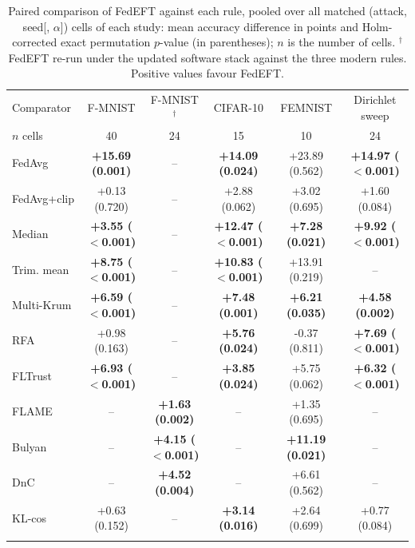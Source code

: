\begin{table}[!tbp]
\centering
\caption{Paired comparison of FedEFT against each rule, pooled over all matched (attack, seed[, $\alpha$]) cells of each study: mean accuracy difference in points and Holm-corrected exact permutation $p$-value (in parentheses); $n$ is the number of cells. $^\dagger$FedEFT re-run under the updated software stack against the three modern rules. Positive values favour FedEFT.}
\label{tab:stats}
\setlength{\tabcolsep}{2.2pt}
\footnotesize
\begin{tabular}{@{}lccccc@{}}
\toprule
Comparator & F-MNIST & F-MNIST$^\dagger$ & CIFAR-10 & FEMNIST & Dirichlet sweep\\
$n$ cells & 40 & 24 & 15 & 10 & 24\\
\midrule
FedAvg & \textbf{+15.69 (0.001)} & -- & \textbf{+14.09 (0.024)} & +23.89 (0.562) & \textbf{+14.97 ($<$0.001)}\\
FedAvg+clip & +0.13 (0.720) & -- & +2.88 (0.062) & +3.02 (0.695) & +1.60 (0.084)\\
Median & \textbf{+3.55 ($<$0.001)} & -- & \textbf{+12.47 ($<$0.001)} & \textbf{+7.28 (0.021)} & \textbf{+9.92 ($<$0.001)}\\
Trim. mean & \textbf{+8.75 ($<$0.001)} & -- & \textbf{+10.83 ($<$0.001)} & +13.91 (0.219) & --\\
Multi-Krum & \textbf{+6.59 ($<$0.001)} & -- & \textbf{+7.48 (0.001)} & \textbf{+6.21 (0.035)} & \textbf{+4.58 (0.002)}\\
RFA & +0.98 (0.163) & -- & \textbf{+5.76 (0.024)} & -0.37 (0.811) & \textbf{+7.69 ($<$0.001)}\\
FLTrust & \textbf{+6.93 ($<$0.001)} & -- & \textbf{+3.85 (0.024)} & +5.75 (0.062) & \textbf{+6.32 ($<$0.001)}\\
FLAME & -- & \textbf{+1.63 (0.002)} & -- & +1.35 (0.695) & --\\
Bulyan & -- & \textbf{+4.15 ($<$0.001)} & -- & \textbf{+11.19 (0.021)} & --\\
DnC & -- & \textbf{+4.52 (0.004)} & -- & +6.61 (0.562) & --\\
KL-cos & +0.63 (0.152) & -- & \textbf{+3.14 (0.016)} & +2.64 (0.699) & +0.77 (0.084)\\
\botrule
\end{tabular}
\end{table}
